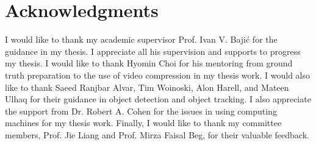 \chapter*{Acknowledgments}

I would like to thank my academic supervisor Prof. Ivan V. Bajić for the guidance in my thesis. I appreciate all his supervision and supports to progress my thesis. I would like to thank Hyomin Choi for his mentoring from ground truth preparation to the use of video compression in my thesis work. I would also like to thank Saeed Ranjbar Alvar, Tim Woinoski, Alon Harell, and Mateen Ulhaq for their guidance in object detection and object tracking. I also appreciate the support from Dr. Robert A. Cohen for the issues in using computing machines for my thesis work. Finally, I would like to thank my committee members, Prof. Jie Liang and Prof. Mirza Faisal Beg, for their valuable feedback.
